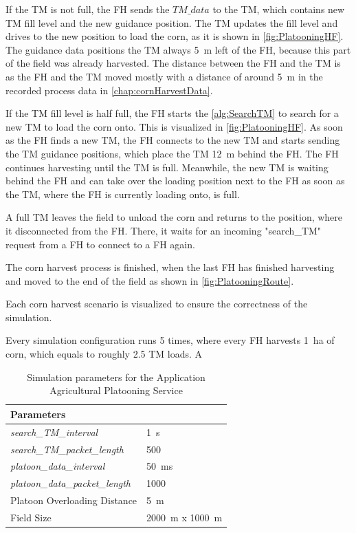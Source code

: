 If the \ac{TM} is not full, the \ac{FH} sends the $TM\_data$ to the \ac{TM},
which contains new \ac{TM} fill level and the new guidance position.
The \ac{TM} updates the fill level and drives to the new position to load the corn, as it is shown in \autoref{fig:PlatooningHF}.
The guidance data positions the \ac{TM} always \SI{5}{\metre} left of the \ac{FH}, because this part of the field was already harvested.
The distance between the \ac{FH} and the \ac{TM} is  as the \ac{FH} and the \ac{TM} moved mostly with a distance of around \SI{5}{\metre} in
the recorded process data in \autoref{chap:cornHarvestData}.

If the \ac{TM} fill level is half full, the \ac{FH} starts the \autoref{alg:SearchTM}
to search for a new \ac{TM} to load the corn onto.
This is visualized in \autoref{fig:PlatooningHF}.
As soon as the \ac{FH} finds a new \ac{TM}, the \ac{FH} connects to the new \ac{TM} and starts sending
the \ac{TM} guidance positions, which place the \ac{TM} \SI{12}{\metre} behind the \ac{FH}.
The \ac{FH} continues harvesting until the \ac{TM} is full.
Meanwhile, the new \ac{TM} is waiting behind the \ac{FH} and can take over the loading position next to the \ac{FH} as
soon as the \ac{TM}, where the \ac{FH} is currently loading onto, is full.

A full \ac{TM} leaves the field to unload the corn and returns to the position, where it disconnected from the \ac{FH}.
There, it waits for an incoming "search\_TM" request from a \ac{FH} to connect to a \ac{FH} again.

The corn harvest process is finished, when the last \ac{FH} has finished harvesting and moved to the end of the field as
shown in \autoref{fig:PlatooningRoute}.

Each corn harvest scenario is visualized to ensure the correctness of the simulation.

Every simulation configuration runs \num{5} times, where every \ac{FH} harvests \SI{1}{\hectare} of corn, which equals to roughly
\num{2.5} \ac{TM} loads.
A


\begin{table}[H]
	\centering
	\begin{tabular}{p{5cm}p{4cm}}
		\toprule
		Parameters & \\
		\midrule
		\textit{search\_TM\_interval} & \SI{1}{\second}\\
		\textit{search\_TM\_packet\_length} & \SI{500}{\byte}\\
		\textit{platoon\_data\_interval} & \SI{50}{\milli\second}\\
		\textit{platoon\_data\_packet\_length} & \SI{1000}{\byte}\\
		Platoon Overloading Distance & \SI{5}{\meter}\\
		Field Size & \SI{2000}{\meter} x \SI{1000}{\meter}\\
		\bottomrule
	\end{tabular}
	\caption{Simulation parameters for the Application Agricultural Platooning Service}
	\label{tab:SimulationParameters}
\end{table}





